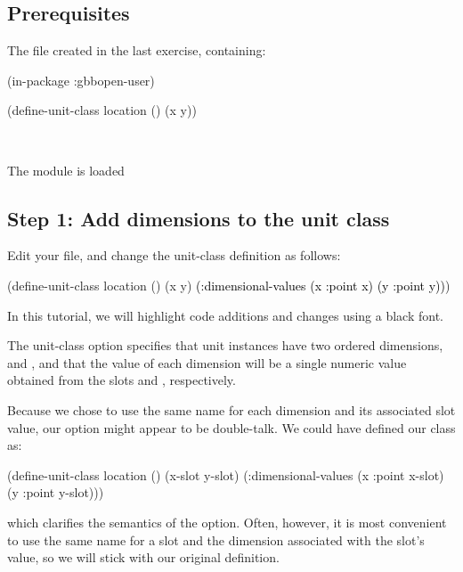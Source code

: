 \documentclass[10pt,twoside,english,pdftex]{article}
\begin{document}
\fndocrule

\subsection*{Prerequisites}

\begin{tightitemize}
\item The  file created in the last exercise, containing:

\begin{example}\color{darkergray}%
(in-package :gbbopen-user)

(define-unit-class location ()
  (x y))
\end{example}
\W\\

\item The  module is loaded
\end{tightitemize}

\subsection*{Step 1: Add dimensions to the  unit class}

Edit your  file, and change the
 unit-class definition as follows:
%
\begin{example}\color{darkergray}%
  (define-unit-class location ()
    (x y)
    \textcolor{black}{(:dimensional-values
      (x :point x)
      (y :point y))})
\end{example}
%
In this tutorial, we will highlight code additions and changes using a
black font.

The  unit-class option specifies that
 unit instances have two ordered dimensions, 
and , and that the value of each dimension will be a single
numeric value obtained from the slots  and ,
respectively.

Because we chose to use the same name for each dimension and its
associated slot value, our  option might
appear to be double-talk.  We could have defined our class as:
%
\begin{example}\color{darkergray}%
  (define-unit-class location ()
    (x-slot y-slot)
    (:dimensional-values
      (x :point x-slot)
      (y :point y-slot)))
\end{example}
%
which clarifies the semantics of the 
option.  Often, however, it is most convenient to use the same name
for a slot and the dimension associated with the slot's value, so we
will stick with our original definition.
\end{document}
